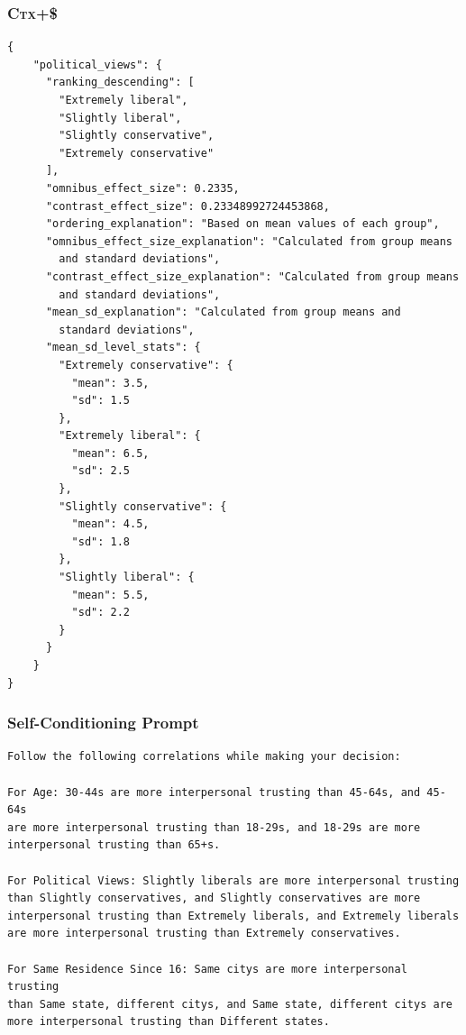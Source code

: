 \documentclass{article} %
\begin{document}
\begin{appendices}
\subsubsection{\textsc{Ctx+\$}}
\label{app:population-belief-samples-ctx-dollar}
\begin{lstlisting}[frame=single,basicstyle=\ttfamily\small,showspaces=false]
{
    "political_views": {
      "ranking_descending": [
        "Extremely liberal",
        "Slightly liberal",
        "Slightly conservative",
        "Extremely conservative"
      ],
      "omnibus_effect_size": 0.2335,
      "contrast_effect_size": 0.23348992724453868,
      "ordering_explanation": "Based on mean values of each group",
      "omnibus_effect_size_explanation": "Calculated from group means
        and standard deviations",
      "contrast_effect_size_explanation": "Calculated from group means
        and standard deviations",
      "mean_sd_explanation": "Calculated from group means and
        standard deviations",
      "mean_sd_level_stats": {
        "Extremely conservative": {
          "mean": 3.5,
          "sd": 1.5
        },
        "Extremely liberal": {
          "mean": 6.5,
          "sd": 2.5
        },
        "Slightly conservative": {
          "mean": 4.5,
          "sd": 1.8
        },
        "Slightly liberal": {
          "mean": 5.5,
          "sd": 2.2
        }
      }
    }
}
\end{lstlisting}


\subsubsection{Self-Conditioning Prompt}
\label{app:population-self-conditioning}

\begin{lstlisting}[frame=single,basicstyle=\ttfamily\small,showspaces=false]
Follow the following correlations while making your decision:

For Age: 30-44s are more interpersonal trusting than 45-64s, and 45-64s 
are more interpersonal trusting than 18-29s, and 18-29s are more 
interpersonal trusting than 65+s.

For Political Views: Slightly liberals are more interpersonal trusting 
than Slightly conservatives, and Slightly conservatives are more 
interpersonal trusting than Extremely liberals, and Extremely liberals 
are more interpersonal trusting than Extremely conservatives.

For Same Residence Since 16: Same citys are more interpersonal trusting 
than Same state, different citys, and Same state, different citys are 
more interpersonal trusting than Different states.


\end{lstlisting}
\end{appendices}
\end{document}
